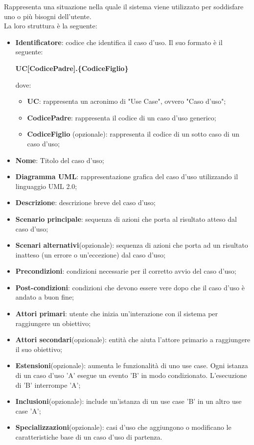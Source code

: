Rappresenta una situazione nella quale il sistema viene utilizzato per soddisfare uno o più bisogni dell'utente.\\
La loro struttura è la seguente:
\begin{itemize}
\item \textbf{Identificatore}: codice che identifica il caso d'uso. Il suo formato è il seguente:
\begin{center}
\textbf{UC[CodicePadre].\{CodiceFiglio\}}\\
\end{center}
dove:
\begin{itemize}
\item \textbf{UC}: rappresenta un acronimo di "Use Case", ovvero "Caso d'uso";
\item \textbf{CodicePadre}: rappresenta il codice di un caso d'uso generico;
\item \textbf{CodiceFiglio} (opzionale): rappresenta il codice di un sotto caso di un caso d'uso;
\end{itemize}
\item \textbf{Nome}: Titolo del caso d'uso;
\item \textbf{Diagramma UML}: rappresentazione grafica del caso d'uso utilizzando il linguaggio UML 2.0; 
\item \textbf{Descrizione}: descrizione breve del caso d'uso;
\item \textbf{Scenario principale}: sequenza di azioni che porta al risultato atteso dal caso d'uso;
\item \textbf{Scenari alternativi}(opzionale): sequenza di azioni che porta ad un risultato inatteso (un errore o un'eccezione) dal caso d'uso;
\item \textbf{Precondizioni}: condizioni necessarie per il corretto avvio del caso d'uso;
\item \textbf{Post-condizioni}: condizioni che devono essere vere dopo che il caso d'uso è andato a buon fine;
\item \textbf{Attori primari}: utente che inizia un'interazione con il sistema per raggiungere un obiettivo;
\item \textbf{Attori secondari}(opzionale): entità che aiuta l'attore primario a raggiungere il suo obiettivo;
\item \textbf{Estensioni}(opzionale): aumenta le funzionalità di uno use case. Ogni istanza di un caso d'uso 'A' esegue un evento 'B' in modo condizionato. L'esecuzione di 'B' interrompe 'A';
\item \textbf{Inclusioni}(opzionale): include un'istanza di un use case 'B' in un altro use case 'A';
\item \textbf{Specializzazioni}(opzionale): casi d'uso che aggiungono o modificano le caratteristiche base di un caso d'uso di partenza.
\end{itemize}